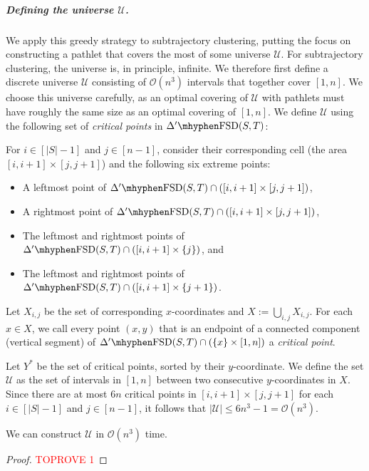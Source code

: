 \documentclass[a4paper,UKenglish,cleveref,thm-restate,notab]{lipics-v2021}
\newcommand{\FSD}[1][\Delta'] {\ensuremath{#1}\mhyphen\mathrm{FSD}}
\newcommand{\bigO}{\mathcal{O}}
\newcommand{\U}{\mathcal{U}}
\begin{document}
    
    \subparagraph{Defining the universe $\U$.}
    We apply this greedy strategy to subtrajectory clustering, putting the focus on constructing a pathlet that covers the most of some universe $\U$.
    For subtrajectory clustering, the universe is, in principle, infinite.
    We therefore first define a discrete universe $\U$ consisting of $\bigO(n^3)$ intervals that together cover $[1, n]$.
    We choose this universe carefully, as an optimal covering of $\U$ with pathlets must have roughly the same size as an optimal covering of $[1, n]$.
    We define $\U$ using the following set of \emph{critical points} in $\FSD(S, T)$:

    \begin{definition}
    \label{def:critical_points}
        For $i \in [|S|-1]$ and $j \in [n-1]$, consider their corresponding cell (the area $[i, i+1] \times [j, j+1]$) and the following six extreme points:       
        \begin{itemize}
            \item A leftmost point of $\FSD(S, T) \cap ([i, i+1] \times [j, j+1])$,
            \item A rightmost point of $\FSD(S, T) \cap ([i, i+1] \times [j, j+1])$,
            \item The leftmost and rightmost points of $\FSD(S, T) \cap ([i, i+1] \times \{j\})$, and
            \item The leftmost and rightmost points of $\FSD(S, T) \cap ([i, i+1] \times \{j+1\})$.
        \end{itemize}
        Let $X_{i, j}$ be the set of corresponding $x$-coordinates and $X := \bigcup\limits_{i, j} X_{i, j}$.
        For each $x \in X$, we call  every point $(x, y)$ that is an endpoint of a connected component (vertical segment) of $\FSD(S, T) \cap (\{x\} \times [1, n])$ a \emph{critical point}.
    \end{definition}

    \begin{definition}
        Let $Y^*$ be the set of critical points, sorted by their $y$-coordinate. 
        We define the set $\U$ as the set of intervals in $[1, n]$ between two consecutive $y$-coordinates in $X$.
        Since there are at most $6n$ critical points in $[i, i+1] \times [j, j+1]$ for each $i \in [|S|-1]$ and $j \in [n-1]$, it follows that $|\U| \leq 6n^3-1 = \bigO(n^3)$. 
    \end{definition}

    \begin{lemma}
    \label{lem:constructing_universe}
        We can construct $\U$ in $\bigO(n^3)$ time.
    \end{lemma}
    \begin{proof}\textcolor{red}{TOPROVE 1}\end{proof}
    
\end{document}
